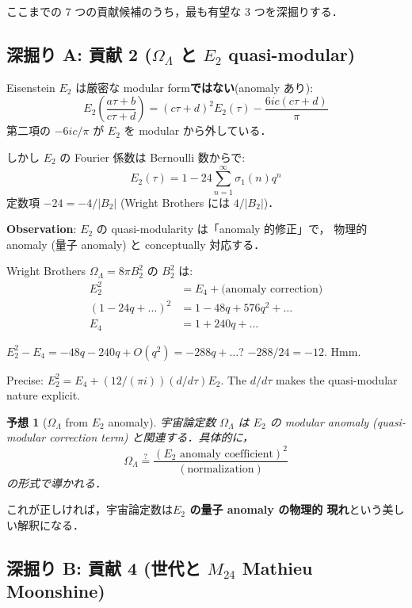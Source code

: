 \documentclass[11pt,a4paper]{article}
\newtheorem{conjecture}{予想}
\begin{document}
ここまでの 7 つの貢献候補のうち，最も有望な 3 つを深掘りする．

\subsection{深掘り A: 貢献 2 ($\Omega_\Lambda$ と $E_2$ quasi-modular)}

Eisenstein $E_2$ は厳密な modular form\textbf{ではない}(anomaly あり):
\begin{equation}
E_2\left(\frac{a\tau+b}{c\tau+d}\right) = (c\tau+d)^2 E_2(\tau) - \frac{6ic(c\tau+d)}{\pi}
\end{equation}
第二項の $-6ic/\pi$ が $E_2$ を modular から外している．

しかし $E_2$ の Fourier 係数は Bernoulli 数からで:
\begin{equation}
E_2(\tau) = 1 - 24\sum_{n=1}^\infty \sigma_1(n) q^n
\end{equation}
定数項 $-24 = -4/|B_2|$ (Wright Brothers には $4/|B_2|$)．

\textbf{Observation}: $E_2$ の quasi-modularity は「anomaly 的修正」で，
物理的 anomaly (量子 anomaly) と conceptually 対応する．

Wright Brothers $\Omega_\Lambda = 8\pi B_2^2$ の $B_2^2$ は:
\begin{align}
E_2^2 &= E_4 + \text{(anomaly correction)}\\
(1 - 24q + \ldots)^2 &= 1 - 48q + 576 q^2 + \ldots\\
E_4 &= 1 + 240q + \ldots
\end{align}

$E_2^2 - E_4 = -48q - 240q + O(q^2) = -288q + \ldots$?
$-288/24 = -12$. Hmm.

Precise: $E_2^2 = E_4 + (12/(\pi i))(d/d\tau) E_2$. The $d/d\tau$
makes the quasi-modular nature explicit.

\begin{conjecture}[$\Omega_\Lambda$ from $E_2$ anomaly]
宇宙論定数 $\Omega_\Lambda$ は $E_2$ の modular anomaly
(quasi-modular correction term) と関連する．具体的に，
\begin{equation}
\Omega_\Lambda \stackrel{?}{=} \frac{(\text{$E_2$ anomaly coefficient})^2}{(\text{normalization})}
\end{equation}
の形式で導かれる．
\end{conjecture}

これが正しければ，宇宙論定数は\textbf{$E_2$ の量子 anomaly の物理的
現れ}という美しい解釈になる．

\subsection{深掘り B: 貢献 4 (世代と $M_{24}$ Mathieu Moonshine)}
\end{document}
